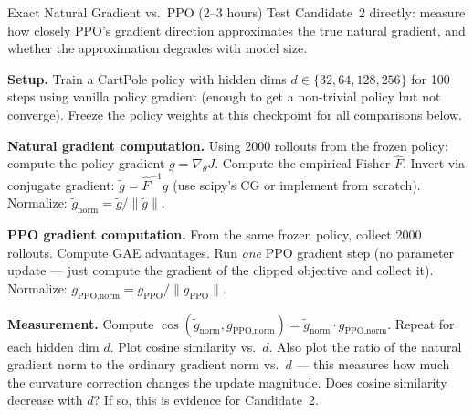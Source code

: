 \begin{exercise}{Exact Natural Gradient vs.\ PPO (2--3 hours)}
Test Candidate~2 directly: measure how closely PPO's gradient direction approximates the true natural gradient, and whether the approximation degrades with model size.

\textbf{Setup.} Train a CartPole policy with hidden dims $d \in \{32, 64, 128, 256\}$ for 100 steps using vanilla policy gradient (enough to get a non-trivial policy but not converge). Freeze the policy weights at this checkpoint for all comparisons below.

\textbf{Natural gradient computation.} Using 2000 rollouts from the frozen policy: compute the policy gradient $g = \nabla_\theta J$. Compute the empirical Fisher $\hat{F}$. Invert via conjugate gradient: $\tilde{g} = \hat{F}^{-1} g$ (use scipy's CG or implement from scratch). Normalize: $\tilde{g}_{\text{norm}} = \tilde{g} / \|\tilde{g}\|$.

\textbf{PPO gradient computation.} From the same frozen policy, collect 2000 rollouts. Compute GAE advantages. Run \textit{one} PPO gradient step (no parameter update --- just compute the gradient of the clipped objective and collect it). Normalize: $g_{\text{PPO,norm}} = g_{\text{PPO}} / \|g_{\text{PPO}}\|$.

\textbf{Measurement.} Compute $\cos(\tilde{g}_{\text{norm}}, g_{\text{PPO,norm}}) = \tilde{g}_{\text{norm}} \cdot g_{\text{PPO,norm}}$. Repeat for each hidden dim $d$. Plot cosine similarity vs.\ $d$. Also plot the ratio of the natural gradient norm to the ordinary gradient norm vs.\ $d$ --- this measures how much the curvature correction changes the update magnitude. Does cosine similarity decrease with $d$? If so, this is evidence for Candidate~2.
\end{exercise}

